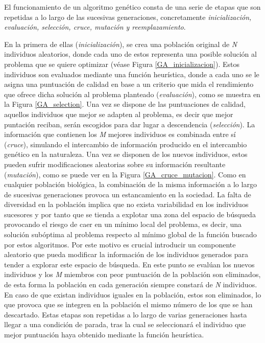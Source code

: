 El funcionamiento de un algoritmo genético consta de una serie de etapas que son repetidas a lo largo de las sucesivas generaciones, concretamente \textit{inicialización, evaluación, selección, cruce, mutación y reemplazamiento}.

En la primera de ellas (\textit{inicialización}), se crea una población original de \textit{N} individuos aleatorios, donde cada uno de estos representa una posible solución al problema que se quiere optimizar (véase Figura \ref{GA_inicializacion}). Estos individuos son evaluados mediante una función heurística, donde a cada uno se le asigna una puntuación de calidad en base a un criterio que mida el rendimiento que ofrece dicha solución al problema planteado (\textit{evaluación}), como se muestra en la Figura \ref{GA_selection}. Una vez se dispone de las puntuaciones de calidad, aquellos individuos que mejor se adapten al problema, es decir que mejor puntación reciban, serán escogidos para dar lugar a descendencia (\textit{selección}). La información que contienen los \textit{M} mejores individuos es combinada entre sí (\textit{cruce}), simulando el intercambio de información producido en el intercambio genético en la naturaleza. Una vez se disponen de los nuevos individuos, estos pueden sufrir modificaciones aleatorias sobre su información resultante (\textit{mutación}), como se puede ver en la Figura \ref{GA_cruce_mutacion}. Como en cualquier población biológica, la combinación  de la misma información a lo largo de sucesivas generaciones provoca un estancamiento en la sociedad. La falta de diversidad en la población implica que no exista variabilidad en los individuos sucesores y por tanto que se tienda a explotar una zona del espacio de búsqueda provocando el riesgo de caer en un mínimo local del problema, es decir, una solución subóptima al problema respecto al mínimo global de la función buscado por estos algoritmos. Por este motivo es crucial introducir un componente aleatorio que pueda modificar la información de los individuos generados para tender a explorar este espacio de búsqueda. En este punto se evalúan los nuevos individuos y los \textit{M} miembros con peor puntuación de la población son eliminados, de esta forma la población en cada generación siempre constará de \textit{N} individuos. En caso de que existan individuos iguales en la población, estos son eliminados, lo que provoca que se integren en la población el mismo número de los que se han descartado. Estas etapas son repetidas a lo largo de varias generaciones hasta llegar a una condición de parada, tras la cual se seleccionará el individuo que mejor puntuación haya obtenido mediante la función heurística.

